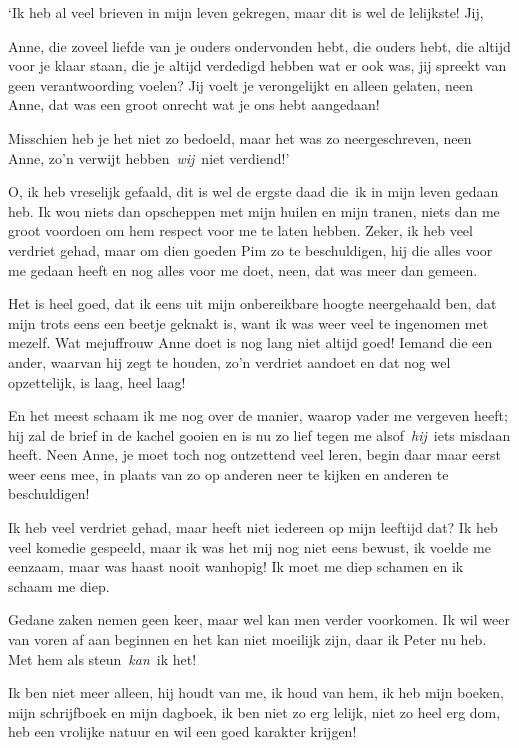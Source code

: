 \documentclass{book}
\begin{document}
`Ik heb al veel brieven in mijn leven gekregen, maar dit is wel de
lelijkste! Jij,

Anne, die zoveel liefde van je ouders ondervonden hebt, die ouders hebt,
die altijd voor je klaar staan, die je altijd verdedigd hebben wat er
ook was, jij spreekt van geen verantwoording voelen? Jij voelt je
verongelijkt en alleen gelaten, neen Anne, dat was een groot onrecht wat
je ons hebt aangedaan!

Misschien heb je het niet zo bedoeld, maar het was zo neergeschreven,
neen Anne, zo'n verwijt hebben~\emph{wij}~niet verdiend!'

O, ik heb vreselijk gefaald, dit is wel de ergste daad die~ik in mijn
leven gedaan heb. Ik wou niets dan opscheppen met mijn huilen en mijn
tranen, niets dan me groot voordoen om hem respect voor me te laten
hebben. Zeker, ik heb veel verdriet gehad, maar om dien goeden Pim zo te
beschuldigen, hij die alles voor me gedaan heeft en nog alles voor me
doet, neen, dat was meer dan gemeen.

Het is heel goed, dat ik eens uit mijn onbereikbare hoogte neergehaald
ben, dat mijn trots eens een beetje geknakt is, want ik was weer veel te
ingenomen met mezelf. Wat mejuffrouw Anne doet is nog lang niet altijd
goed! Iemand die een ander, waarvan hij zegt te houden, zo'n verdriet
aandoet en dat nog wel opzettelijk, is laag, heel laag!

En het meest schaam ik me nog over de manier, waarop vader me vergeven
heeft; hij zal de brief in de kachel gooien en is nu zo lief tegen me
alsof~\emph{hij}~iets misdaan heeft. Neen Anne, je moet toch nog
ontzettend veel leren, begin daar maar eerst weer eens mee, in plaats
van zo op anderen neer te kijken en anderen te beschuldigen!

Ik heb veel verdriet gehad, maar heeft niet iedereen op mijn leeftijd
dat? Ik heb veel komedie gespeeld, maar ik was het mij nog niet eens
bewust, ik voelde me eenzaam, maar was haast nooit wanhopig! Ik moet me
diep schamen en ik schaam me diep.

Gedane zaken nemen geen keer, maar wel kan men verder voorkomen. Ik wil
weer van voren af aan beginnen en het kan niet moeilijk zijn, daar ik
Peter nu heb. Met hem als steun~\emph{kan}~ik het!

Ik ben niet meer alleen, hij houdt van me, ik houd van hem, ik heb mijn
boeken, mijn schrijfboek en mijn dagboek, ik ben niet zo erg lelijk,
niet zo heel erg dom, heb een vrolijke natuur en wil een goed karakter
krijgen!
\end{document}
